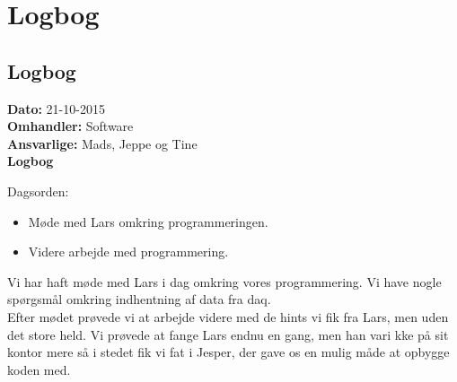 \chapter{Logbog}
\section{Logbog}

\textbf{Dato:} 21-10-2015 \\
\textbf{Omhandler:} Software \\
\textbf{Ansvarlige:} Mads, Jeppe og Tine \\
\textbf{Logbog}

Dagsorden:
\begin{itemize}
	\item Møde med Lars omkring programmeringen.
	\item Videre arbejde med programmering. 
\end{itemize}

Vi har haft møde med Lars i dag omkring vores programmering. Vi have nogle spørgsmål omkring indhentning af data fra daq.\\
Efter mødet prøvede vi at arbejde videre med de hints vi fik fra Lars, men uden det store held. Vi prøvede at fange Lars endnu en gang, men han vari kke på sit kontor mere så i stedet fik vi fat i Jesper, der gave os en mulig måde at opbygge koden med. 
   
